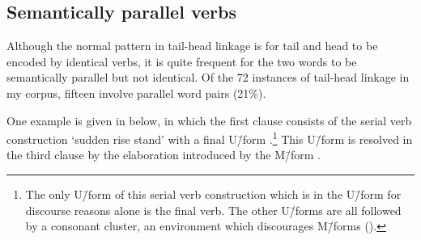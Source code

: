 \subsection{Semantically parallel verbs}\label{sec:ParVer}
Although the normal pattern in tail-head linkage is for tail and head to be encoded by identical verbs,
it is quite frequent for the two words to
be semantically parallel but not identical.
Of the 72 instances of tail-head linkage in my corpus,
fifteen involve parallel word pairs (21\%).

One example is given in  below,
in which the first clause consists of the serial verb construction
 `sudden rise stand' with a final U\=/form .\footnote{
		The only U\=/form of this serial verb construction which is in the U\=/form
		for discourse reasons alone is the final verb.
		The other U\=/forms are all followed by a consonant cluster,
		an environment which discourages M\=/forms ().}
This U\=/form is resolved in the third clause by the elaboration
introduced by the M\=/form .

\newpage
\begin{exe}
	\label{ex:120715-4, 0.25-0.27}
	\begin{xlist}
		\label{ex:120715-4, 0.25}
		\label{ex:120715-4, 0.27a}
	\end{xlist}
\end{exe}

